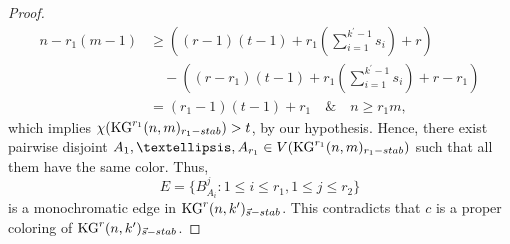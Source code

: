 \documentclass[10pt,a4paper]{amsart}
\begin{document}
\begin{proof}
\begin{align*}
  n-r_1(m-1) & \geq \left((r-1)(t-1)+r_1\left(\sum_{i=1}^{k^{\prime}-1}s_i\right)+ r\right) \\
  & \quad - \left((r-r_1)(t-1)+r_1\left(\sum_{i=1}^{k^{\prime}-1}s_i\right)+r-r_1\right) \\
  & = (r_1-1)(t-1)+r_1 \quad \& \quad n\geq r_1m,
\end{align*}
which implies $\chi(\mathrm{KG}^{r_1}(n,m)_{r_1\textup{-stab}}) > t$, by our hypothesis. Hence, there exist pairwise disjoint $A_1, \ldots , A_{r_1}\in V(\mathrm{KG}^{r_1}(n,m)_{r_1\textup{-stab}})$ such that all them have the same color. Thus,
\[
E=\{B_{A_i}^{j} : 1\leq i\leq r_1, 1\leq j\leq r_2 \}
\] 
is a monochromatic edge in $\mathrm{KG}^{r}(n,k^{\prime})_{\vec{s}\textup{-stab}}$. This contradicts that $c$ is a proper coloring of $\mathrm{KG}^{r}(n,k^{\prime})_{\vec{s}\textup{-stab}}$. 
\end{proof}
\end{document}
